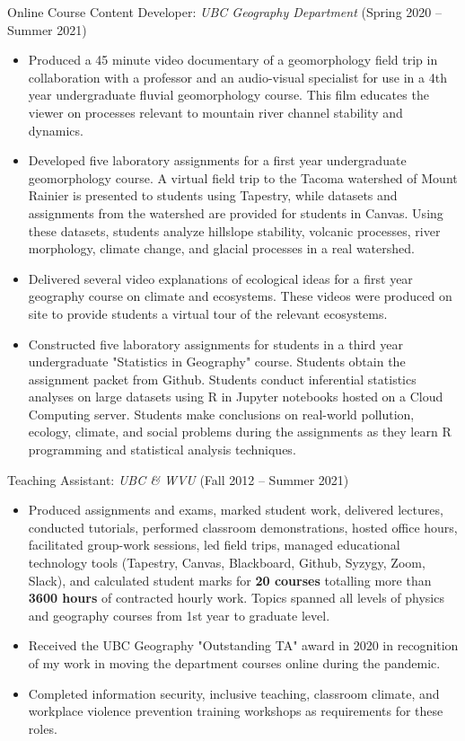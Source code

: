 \documentclass[10pt]{res} %
\begin{document}
\begin{resume}
{Online Course Content Developer: \sl UBC Geography Department} \hfill (Spring 2020 -- Summer 2021) \\
\begin{itemize} \itemsep -2pt %
	\item Produced a 45 minute video documentary of a geomorphology field trip in collaboration with a professor and an audio-visual specialist for use in a 4th year undergraduate fluvial geomorphology course. This film educates the viewer on processes relevant to mountain river channel stability and dynamics.
	\item Developed five laboratory assignments for a first year undergraduate geomorphology course. A virtual field trip to the Tacoma watershed of Mount Rainier is presented to students using Tapestry, while datasets and assignments from the watershed are provided for students in Canvas. Using these datasets, students analyze hillslope stability, volcanic processes, river morphology, climate change, and glacial processes in a real watershed.
	\item Delivered several video explanations of ecological ideas for a first year geography course on climate and ecosystems. These videos were produced on site to provide students a virtual tour of the relevant ecosystems.
	\item Constructed five laboratory assignments for students in a third year undergraduate "Statistics in Geography" course. Students obtain the assignment packet from Github. Students conduct inferential statistics analyses on large datasets using R in Jupyter notebooks hosted on a Cloud Computing server.  Students make conclusions on real-world pollution, ecology, climate, and social problems during the assignments as they learn R programming and statistical analysis techniques.
\end{itemize}


{Teaching Assistant: \sl UBC \& WVU} \hfill (Fall 2012 -- Summer 2021) \\
\begin{itemize} \itemsep -2pt %
	\item Produced assignments and exams, marked student work, delivered lectures, conducted tutorials, performed classroom demonstrations, hosted office hours, facilitated group-work sessions, led field trips, managed educational technology tools (Tapestry, Canvas, Blackboard, Github, Syzygy, Zoom, Slack), and calculated student marks for \textbf{20 courses} totalling more than \textbf{3600 hours} of contracted hourly work. Topics spanned all levels of physics and geography courses from 1st year to graduate level.
	\item Received the UBC Geography "Outstanding TA" award in 2020 in recognition of my work in moving the department courses online during the pandemic.
	\item Completed information security, inclusive teaching, classroom climate, and workplace violence prevention training workshops as requirements for these roles.
\end{itemize}
 

\end{resume}
\end{document}
